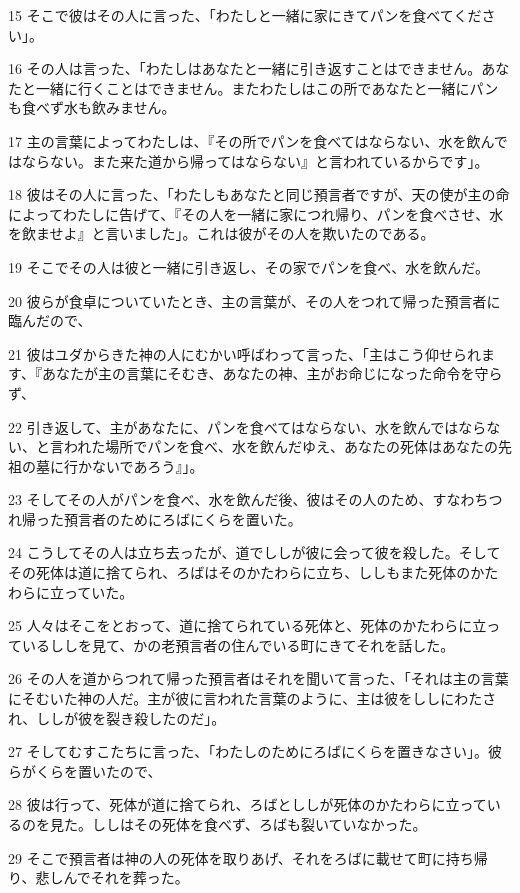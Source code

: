 \par 15 そこで彼はその人に言った、「わたしと一緒に家にきてパンを食べてください」。
\par 16 その人は言った、「わたしはあなたと一緒に引き返すことはできません。あなたと一緒に行くことはできません。またわたしはこの所であなたと一緒にパンも食べず水も飲みません。
\par 17 主の言葉によってわたしは、『その所でパンを食べてはならない、水を飲んではならない。また来た道から帰ってはならない』と言われているからです」。
\par 18 彼はその人に言った、「わたしもあなたと同じ預言者ですが、天の使が主の命によってわたしに告げて、『その人を一緒に家につれ帰り、パンを食べさせ、水を飲ませよ』と言いました」。これは彼がその人を欺いたのである。
\par 19 そこでその人は彼と一緒に引き返し、その家でパンを食べ、水を飲んだ。
\par 20 彼らが食卓についていたとき、主の言葉が、その人をつれて帰った預言者に臨んだので、
\par 21 彼はユダからきた神の人にむかい呼ばわって言った、「主はこう仰せられます、『あなたが主の言葉にそむき、あなたの神、主がお命じになった命令を守らず、
\par 22 引き返して、主があなたに、パンを食べてはならない、水を飲んではならない、と言われた場所でパンを食べ、水を飲んだゆえ、あなたの死体はあなたの先祖の墓に行かないであろう』」。
\par 23 そしてその人がパンを食べ、水を飲んだ後、彼はその人のため、すなわちつれ帰った預言者のためにろばにくらを置いた。
\par 24 こうしてその人は立ち去ったが、道でししが彼に会って彼を殺した。そしてその死体は道に捨てられ、ろばはそのかたわらに立ち、ししもまた死体のかたわらに立っていた。
\par 25 人々はそこをとおって、道に捨てられている死体と、死体のかたわらに立っているししを見て、かの老預言者の住んでいる町にきてそれを話した。
\par 26 その人を道からつれて帰った預言者はそれを聞いて言った、「それは主の言葉にそむいた神の人だ。主が彼に言われた言葉のように、主は彼をししにわたされ、ししが彼を裂き殺したのだ」。
\par 27 そしてむすこたちに言った、「わたしのためにろばにくらを置きなさい」。彼らがくらを置いたので、
\par 28 彼は行って、死体が道に捨てられ、ろばとししが死体のかたわらに立っているのを見た。ししはその死体を食べず、ろばも裂いていなかった。
\par 29 そこで預言者は神の人の死体を取りあげ、それをろばに載せて町に持ち帰り、悲しんでそれを葬った。
